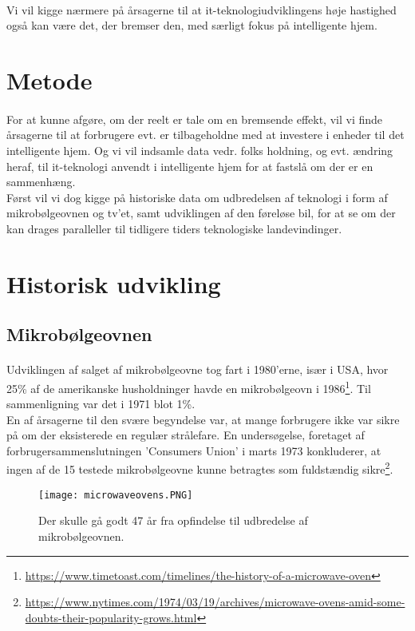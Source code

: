 \documentclass{article}
\begin{document}
\paragraph{}
Vi vil kigge nærmere på årsagerne til at it-teknologiudviklingens høje hastighed også kan være det, der bremser den, med særligt fokus på intelligente hjem.
\section{Metode}
\paragraph{}
For at kunne afgøre, om der reelt er tale om en bremsende effekt, vil vi finde årsagerne til at forbrugere evt. er tilbageholdne med at investere i enheder til det intelligente hjem.
Og vi vil indsamle data vedr. folks holdning, og evt. ændring heraf, til it-teknologi anvendt i intelligente hjem for at fastslå om der er en sammenhæng.\\
Først vil vi dog kigge på historiske data om udbredelsen af teknologi i form af mikrobølgeovnen og tv'et, samt udviklingen af den føreløse bil, for at se om der kan drages paralleller til tidligere tiders teknologiske landevindinger.
\section{Historisk udvikling}
\subsection{Mikrobølgeovnen}
\paragraph{}
Udviklingen af salget af mikrobølgeovne tog fart i 1980'erne, især i USA, hvor 25\% af de amerikanske husholdninger havde en mikrobølgeovn i 1986\footnote{\url{https://www.timetoast.com/timelines/the-history-of-a-microwave-oven}}.
Til sammenligning var det i 1971 blot 1\%.\\
En af årsagerne til den svære begyndelse var, at mange forbrugere ikke var sikre på om der eksisterede en regulær strålefare. En undersøgelse, foretaget af forbrugersammenslutningen 'Consumers Union' i marts 1973 konkluderer, at ingen af de 15 testede mikrobølgeovne kunne betragtes som fuldstændig sikre\footnote{\url{https://www.nytimes.com/1974/03/19/archives/microwave-ovens-amid-some-doubts-their-popularity-grows.html}}.
\begin{figure}[htb]
    \centering
    \texttt{[image: microwaveovens.PNG]}
    \caption{Der skulle gå godt 47 år fra opfindelse til udbredelse af mikrobølgeovnen.}
    \label{fig:microwaveovens}
\end{figure}
\end{document}
